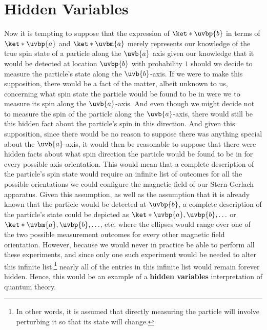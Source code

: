 \section{Hidden Variables }
Now it is tempting to suppose that the expression of $\ket*{\uvbp{b}}$ in terms of $\ket*{\uvbp{a}}$ and $\ket*{\uvbm{a}}$ merely represents our knowledge of the true spin state of a particle along the $\uvb{a}$ axis given our knowledge that it would be detected at location $\uvbp{b}$ with probability $1$ should we decide to measure the particle's state along the $\uvb{b}$-axis. If we were to make this supposition, there would be a fact of the matter, albeit unknown to us, concerning what spin state the particle would be found to be in  were we to measure its spin along the $\uvb{a}$-axis. And  even though we might decide not to measure the spin of the particle along the $\uvb{a}$-axis, there would still be this hidden fact about the particle's spin in this direction. And given this supposition, since there would be no reason to suppose there was anything special about the $\uvb{a}$-axis, it would then be reasonable to suppose that there were hidden facts about what spin direction the particle would be found to be in for every possible axis orientation. This would mean that a complete description of the particle's spin state would require an infinite list of outcomes for all the possible orientations we could configure the magnetic field of our Stern-Gerlach apparatus. Given this assumption, as well as the assumption that it is already known that the particle would be detected at $\uvbp{b}$, a complete description of the particle's  state could be depicted as $\ket*{\uvbp{a},\uvbp{b},\ldots}$ or  $\ket*{\uvbm{a},\uvbp{b},\ldots}$, etc. where the ellipses would range over one of the two possible measurement outcomes for every other magnetic field orientation. However, because we would never in practice be able to perform all these experiments, and since only one such experiment would be needed to alter this infinite list,\footnote{In other words, it is assumed that directly measuring the particle will involve perturbing it so that its state will change.} nearly all of the entries in this infinite list would remain forever hidden. Hence, this would be an example of a \textbf{hidden variables} interpretation of quantum theory.  
